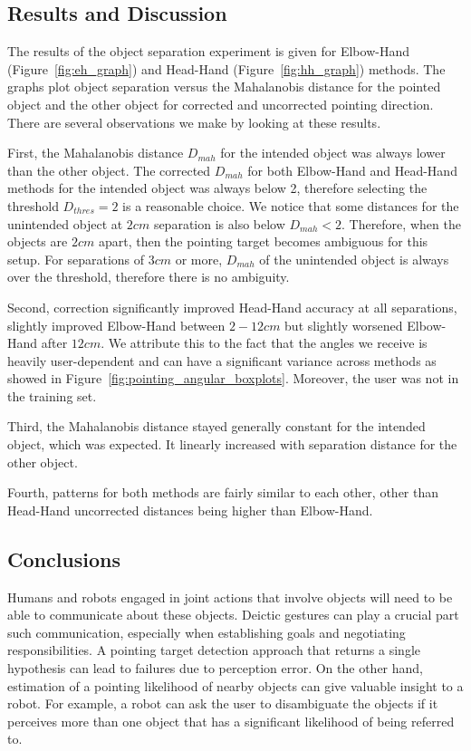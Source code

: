 \subsection{Results and Discussion}
\label{sec:results_and_discussion}

The results of the object separation experiment is given for Elbow-Hand (Figure~\ref{fig:eh_graph}) and Head-Hand (Figure~\ref{fig:hh_graph}) methods. The graphs plot object separation versus the Mahalanobis distance for the pointed object and the other object for corrected and uncorrected pointing direction. There are several observations we make by looking at these results.

First, the Mahalanobis distance $D_{mah}$ for the intended object was always lower than the other object. The corrected $D_{mah}$ for both Elbow-Hand and Head-Hand methods for the intended object was always below 2, therefore selecting the threshold $D_{thres}=2$ is a reasonable choice. We notice that some distances for the unintended object at $2cm$ separation is also below $D_{mah}<2$. Therefore, when the objects are $2 cm$ apart, then the pointing target becomes ambiguous for this setup. For separations of $3cm$ or more, $D_{mah}$ of the unintended object is always over the threshold, therefore there is no ambiguity.

Second, correction significantly improved Head-Hand accuracy at all separations, slightly improved Elbow-Hand between $2-12cm$ but slightly worsened Elbow-Hand after $12cm$. We attribute this to the fact that the angles we receive is heavily user-dependent and can have a significant variance across methods as showed in Figure~\ref{fig:pointing_angular_boxplots}. Moreover, the user was not in the training set.

Third, the Mahalanobis distance stayed generally constant for the intended object, which was expected. It linearly increased with separation distance for the other object.

Fourth, patterns for both methods are fairly similar to each other, other than Head-Hand uncorrected distances being higher than Elbow-Hand.

\subsection{Conclusions}
\label{sec:pointing_conclusions}

Humans and robots engaged in joint actions that involve objects will need to be able to communicate about these objects. Deictic gestures can play a crucial part such communication, especially when establishing goals and negotiating responsibilities. A pointing target detection approach that returns a single hypothesis can lead to failures due to perception error. On the other hand, estimation of a pointing likelihood of nearby objects can give valuable insight to a robot. For example, a robot can ask the user to disambiguate the objects if it perceives more than one object that has a significant likelihood of being referred to.


